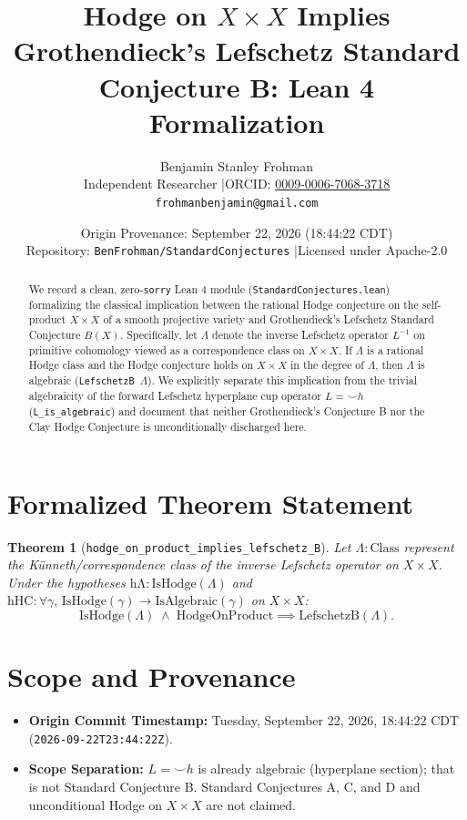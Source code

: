 \documentclass[11pt]{article}
\title{\textbf{Hodge on $X \times X$ Implies Grothendieck's Lefschetz Standard Conjecture B: Lean 4 Formalization}}
\author{Benjamin Stanley Frohman\\
\small Independent Researcher \quad|\quad ORCID: \href{https://orcid.org/0009-0006-7068-3718}{0009-0006-7068-3718}\\
\small \texttt{frohmanbenjamin@gmail.com}}
\date{Origin Provenance: September 22, 2026 (18:44:22 CDT) \\ \small Repository: \texttt{BenFrohman/StandardConjectures} \quad|\quad Licensed under Apache-2.0}
\newtheorem{theorem}{Theorem}
\begin{document}
\maketitle

\begin{abstract}
We record a clean, zero-\texttt{sorry} Lean 4 module (\texttt{StandardConjectures.lean}) formalizing the classical implication between the rational Hodge conjecture on the self-product $X \times X$ of a smooth projective variety and Grothendieck's Lefschetz Standard Conjecture $B(X)$. Specifically, let $\Lambda$ denote the inverse Lefschetz operator $L^{-1}$ on primitive cohomology viewed as a correspondence class on $X \times X$. If $\Lambda$ is a rational Hodge class and the Hodge conjecture holds on $X \times X$ in the degree of $\Lambda$, then $\Lambda$ is algebraic (\texttt{LefschetzB $\Lambda$}). We explicitly separate this implication from the trivial algebraicity of the forward Lefschetz hyperplane cup operator $L = \smile h$ (\texttt{L\_is\_algebraic}) and document that neither Grothendieck's Conjecture B nor the Clay Hodge Conjecture is unconditionally discharged here.
\end{abstract}

\section{Formalized Theorem Statement}
\begin{theorem}[\texttt{hodge\_on\_product\_implies\_lefschetz\_B}]
Let $\Lambda : \mathrm{Class}$ represent the K\"unneth/correspondence class of the inverse Lefschetz operator on $X \times X$. Under the hypotheses $\mathrm{h\Lambda} : \mathrm{IsHodge}(\Lambda)$ and $\mathrm{hHC} : \forall \gamma,\, \mathrm{IsHodge}(\gamma) \to \mathrm{IsAlgebraic}(\gamma)$ on $X \times X$:
\[
\mathrm{IsHodge}(\Lambda) \;\wedge\; \mathrm{HodgeOnProduct} \implies \mathrm{LefschetzB}(\Lambda).
\]
\end{theorem}

\section{Scope and Provenance}
\begin{itemize}
  \item \textbf{Origin Commit Timestamp:} Tuesday, September 22, 2026, 18:44:22 CDT (\texttt{2026-09-22T23:44:22Z}).
  \item \textbf{Scope Separation:} $L = \smile h$ is already algebraic (hyperplane section); that is not Standard Conjecture B. Standard Conjectures A, C, and D and unconditional Hodge on $X \times X$ are not claimed.
\end{itemize}
\end{document}
